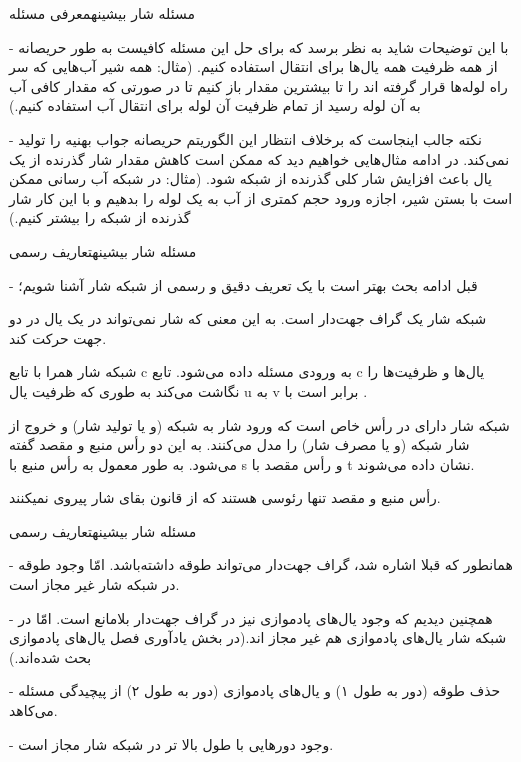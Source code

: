 \begin{itemframe}{مسئله شار بیشینه}{معرفی مسئله}

	\item[-]
با این توضیحات شاید به نظر برسد که برای حل این مسئله کافیست به طور حریصانه از همه ظرفیت همه یال‌ها برای انتقال استفاده کنیم. (مثال: همه شیر آب‌هایی که سر راه لوله‌ها قرار گرفته اند را تا بیشترین مقدار باز کنیم تا در صورتی که مقدار کافی آب به آن لوله رسید از تمام ظرفیت آن لوله برای انتقال آب استفاده کنیم.)
	\item[-]
نکته جالب اینجاست که برخلاف انتظار این الگوریتم حریصانه جواب بهنیه را تولید نمی‌کند. در ادامه مثال‌هایی خواهیم دید که ممکن است کاهش مقدار شار گذرنده از یک یال باعث افزایش شار کلی گذرنده از شبکه شود. (مثال: در شبکه آب رسانی ممکن است با بستن شیر، اجازه ورود حجم کمتری از آب به یک لوله را بدهیم و با این کار شار گذرنده از شبکه را بیشتر کنیم.)
\end{itemframe}

\begin{itemframe}{مسئله شار بیشینه}{تعاریف رسمی}
\item[-]
قبل ادامه بحث بهتر است با یک تعریف دقیق و رسمی از شبکه شار آشنا شویم؛
\item
شبکه شار یک گراف جهت‌دار است. به این معنی که شار نمی‌تواند در یک یال در دو جهت حرکت کند.

شبکه شار همرا با تابع c به ورودی مسئله داده می‌شود. تابع c یال‌ها و ظرفیت‌‌ها را نگاشت می‌کند به طوری که ظرفیت یال u به v برابر است با
 .
\item
شبکه شار دارای در رأس خاص است که ورود شار به شبکه (و یا تولید شار) و خروج از شار شبکه (و یا مصرف شار) را مدل می‌کنند. به این دو رأس منبع
و مقصد
گفته می‌شود. به طور معمول به رأس منبع با s و رأس مقصد با t نشان داده می‌شوند.
\item
رأس منبع و مقصد تنها رئوسی هستند که از قانون بقای شار پیروی نمیکنند.
\end{itemframe}

\begin{itemframe}{مسئله شار بیشینه}{تعاریف رسمی}
\item[-]
همانطور که قبلا اشاره شد، گراف جهت‌دار می‌تواند طوقه داشته‌باشد. امّا وجود طوقه در شبکه شار غیر مجاز است.
\item[-]
همچنین دیدیم که وجود یال‌های پادموازی نیز در گراف جهت‌دار بلامانع است. امّا در شبکه شار یال‌های پادموازی هم غیر مجاز اند.(در بخش يادآوری فصل یال‌های پادموازی بحث شده‌اند.)
\item[-]
حذف طوقه (دور به طول ۱) و یال‌های پادموازی (دور به طول ۲) از پیچیدگی مسئله می‌کاهد.
\item[-]
وجود دورهایی با طول بالا تر در شبکه شار مجاز است.
\end{itemframe}

